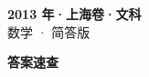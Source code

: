 \documentclass[zihao=-4, a4paper]{ctexart}
\begin{document}
\begin{center}
  {\Large\bfseries 2013 年·上海卷·文科}\\[4pt]
  {\large 数学 · 简答版}
\end{center}
\medskip
{}

\clearpage
{}
\begin{center}{\Large\bfseries 答案速查}\end{center}
\medskip

\end{document}
